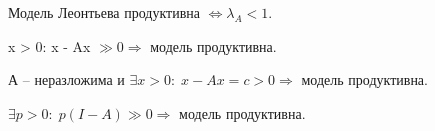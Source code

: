 \begin{theorem}
	Модель Леонтьева продуктивна $\Leftrightarrow \lambda_A < 1.$
\end{theorem}

\begin{clair}
	x > 0: x - Ax $\gg 0 \Rightarrow$ модель продуктивна.
\end{clair}

\begin{clair}
	А -- неразложима и $\exists x > 0: \; x - Ax = c > 0 \Rightarrow $ модель продуктивна.
\end{clair}

\begin{clair}
	$\exists p > 0: \; p(I - A) \gg 0 \Rightarrow $ модель продуктивна.
\end{clair}